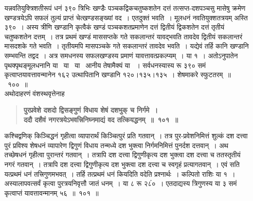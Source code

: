 \documentclass[11pt, openany]{book}
\begin{document}
\begin{sloppypar}
यन्नवतियुक्त्रिशतीरूपं धनं ३९० त्रिभिः खण्डैः पञ्चकद्विकचतुष्कशतेन दत्तं तत्सप्त-दशपञ्चसु मासेषु क्रमेण खण्डत्रयेऽपि सफलं तुल्यं प्राप्तं चेत्खण्डसङ्ख्यां वद~। एतदुक्तं भवति~। मूलधनं नवतियुक्शतत्रयम् अस्ति ३९०~। अस्य त्रीणि खण्डानि कृत्वैकं खण्डं पञ्चकशतप्रमाणेन दत्तं द्वितीयं द्विकशतेन दत्तं तृतीयं चतुष्कशतेन दत्तम्~। तत्र प्रथमं खण्डं माससप्तके गते सकलान्तरं यावद्भवति तावदेव द्वितीयं सकलान्तरं मासदशके गते भवति~। तृतीयमपि मासपञ्चके गते सकलान्तरं तावदेव भवति~। यद्येवं तर्हि कानि खण्डानि सम्भवन्ति तद्वद~। अत्र समधनस्य सफलखण्डस्य प्रमाणं यावत्तावत्प्रकल्प्यम्~। या १~। अतोऽनुपातेन पृथक्पृथङ्मूलधनानि या \, या \, या \, आनीय तेषामैक्यं या ~। सर्वधनस्यास्य रू ३९० समं कृत्वाप्तयावत्तावन्मानेन १६२ उत्थापितानि खण्डानि १२०।१३५।१३५~। शेषमाकरे स्फुटतरम्~॥~१००~॥\\

{\small अथोदाहरणं वंशस्थवृत्तेनाह\textendash }

 \label{7.101}
\begin{quote}
{\large \textbf{{\color{purple}पुरप्रवेशे दशदो द्विसङ्गुणं विधाय शेषं दशभुक् च निर्गमे~।\\
ददौ दशैवं नगरत्रयेऽभवत्त्रिनिघ्नमाद्यं वद तत्कियद्धनम्~॥~१०१~॥}}}
\end{quote}

कश्चिद्वणिक् किञ्चिद्धनं गृहीत्वा व्यापारार्थं किञ्चित्पुरं प्रति गतवान्~। तत्र पुर-प्रवेशनिमित्तं शुल्कं दश दत्त्वा पुरं प्रविश्य शेषधनं व्यापारेण द्विगुणं विधाय तन्मध्ये दश भुक्त्वा निर्गमनिमित्तं पुनर्दश दत्तवान्~। अथ तच्छेषधनं गृहीत्वा पुरान्तरं गतवान्~। तत्रापि दश दत्त्वा द्विगुणीकृत्य दश भुक्त्वा दश दत्त्वा च ततस्तृतीयं नगरं गतवान्~। तत्रापि दश दत्त्वा द्विगुणीकृत्य दश भुक्त्वा दश दत्त्वा च स्वगृहं प्रत्यागतवान्~। एवं सति यत्प्रथमं धनं तत्त्रिगुणमभवत्~। तर्हि तत्प्रथमं धनं कियदिति वदेति प्रश्नार्थः~। कल्पितो राशिः या १~। अस्यालापवत्सर्वं कृत्वा पुरत्रयनिवृत्तौ जातं धनम्~। या ८ रू २८ं०~। एतदाद्यस्य त्रिगुणस्य या ३ समं कृत्वाप्तं यावत्तावन्मानम् ५६~॥~१०१~॥
\end{sloppypar}
\end{document}
